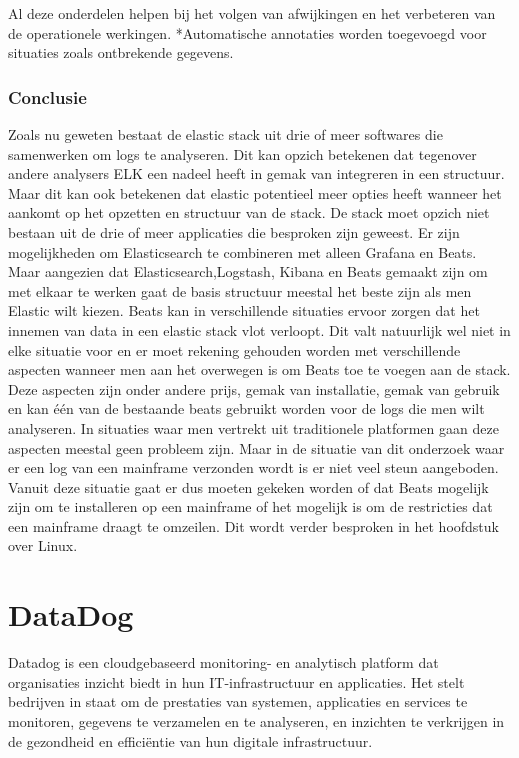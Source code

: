 Al deze onderdelen helpen bij het volgen van afwijkingen en het verbeteren van de operationele werkingen.
*Automatische annotaties worden toegevoegd voor situaties zoals ontbrekende gegevens. ~\autocite{Elatic(2)} 

\subsubsection{Conclusie}
Zoals nu geweten bestaat de elastic stack uit drie of meer softwares die samenwerken om logs te analyseren. Dit kan opzich betekenen dat tegenover andere analysers ELK een nadeel heeft in gemak van integreren in een structuur. Maar dit kan ook betekenen dat elastic potentieel meer opties heeft wanneer het aankomt op het opzetten en structuur van de stack. De stack moet opzich niet bestaan uit de drie of meer applicaties die besproken zijn geweest. Er zijn mogelijkheden om Elasticsearch te combineren met alleen Grafana en Beats. Maar aangezien dat Elasticsearch,Logstash, Kibana en Beats gemaakt zijn om met elkaar te werken gaat de basis structuur meestal het beste zijn als men Elastic wilt kiezen. Beats kan in verschillende situaties ervoor zorgen dat het innemen van data in een elastic stack vlot verloopt. Dit valt natuurlijk wel niet in elke situatie voor en er moet rekening gehouden worden met verschillende aspecten wanneer men aan het overwegen is om Beats toe te voegen aan de stack. Deze aspecten zijn onder andere prijs, gemak van installatie, gemak van gebruik en kan één van de bestaande beats gebruikt worden voor de logs die men wilt analyseren. In situaties waar men vertrekt uit traditionele platformen gaan deze aspecten meestal geen probleem zijn. Maar in de situatie van dit onderzoek waar er een log van een mainframe verzonden wordt is er niet veel steun aangeboden. Vanuit deze situatie gaat er dus moeten gekeken worden of dat Beats mogelijk zijn om te installeren op een mainframe of het mogelijk is om de restricties dat een mainframe draagt te omzeilen. Dit wordt verder besproken in het hoofdstuk over Linux.

\section{DataDog}
Datadog is een cloudgebaseerd monitoring- en analytisch platform dat organisaties inzicht biedt in hun IT-infrastructuur en applicaties. Het stelt bedrijven in staat om de prestaties van systemen, applicaties en services te monitoren, gegevens te verzamelen en te analyseren, en inzichten te verkrijgen in de gezondheid en efficiëntie van hun digitale infrastructuur.

